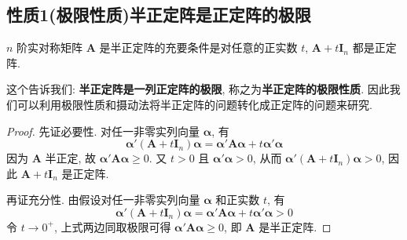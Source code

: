 \documentclass[../../main.tex]{subfiles}%
\begin{document}
\subsection{性质1(极限性质)半正定阵是正定阵的极限}

\begin{proposition}\label{proposition:半正定阵关于摄动的充要条件}
\(n\) 阶实对称矩阵 \(\boldsymbol{A}\) 是半正定阵的充要条件是对任意的正实数 \(t\), \(\boldsymbol{A}+t\boldsymbol{I}_n\) 都是正定阵.
\end{proposition}
\begin{remark}
这个告诉我们: \textbf{半正定阵是一列正定阵的极限}, 称之为\textbf{半正定阵的极限性质}. 因此我们可以利用极限性质和摄动法将半正定阵的问题转化成正定阵的问题来研究.
\end{remark}
\begin{proof}

先证必要性. 对任一非零实列向量 \(\boldsymbol{\alpha}\), 有
\[\boldsymbol{\alpha}'(\boldsymbol{A}+t\boldsymbol{I}_n)\boldsymbol{\alpha}=\boldsymbol{\alpha}'\boldsymbol{A}\boldsymbol{\alpha}+t\boldsymbol{\alpha}'\boldsymbol{\alpha}\]
因为 \(\boldsymbol{A}\) 半正定, 故 \(\boldsymbol{\alpha}'\boldsymbol{A}\boldsymbol{\alpha}\geqslant 0\). 又 \(t>0\) 且 \(\boldsymbol{\alpha}'\boldsymbol{\alpha}>0\), 从而 \(\boldsymbol{\alpha}'(\boldsymbol{A}+t\boldsymbol{I}_n)\boldsymbol{\alpha}>0\), 因此 \(\boldsymbol{A}+t\boldsymbol{I}_n\) 是正定阵.

再证充分性. 由假设对任一非零实列向量 \(\boldsymbol{\alpha}\) 和正实数 \(t\), 有
\[\boldsymbol{\alpha}'(\boldsymbol{A}+t\boldsymbol{I}_n)\boldsymbol{\alpha}=\boldsymbol{\alpha}'\boldsymbol{A}\boldsymbol{\alpha}+t\boldsymbol{\alpha}'\boldsymbol{\alpha}>0\]
令 \(t\to0^+\), 上式两边同取极限可得 \(\boldsymbol{\alpha}'\boldsymbol{A}\boldsymbol{\alpha}\geqslant 0\), 即 \(\boldsymbol{A}\) 是半正定阵. 

\end{proof}
\end{document}
